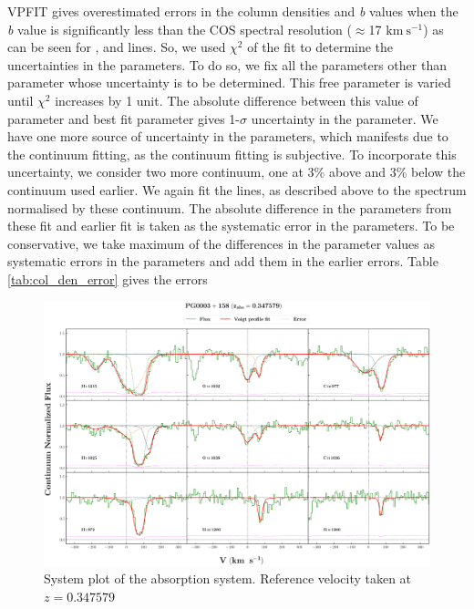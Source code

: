 VPFIT gives overestimated errors in the column densities and \emph{b} values when the \emph{b} value is significantly less than the COS spectral resolution ($\approx$17 $\text{km} \ \text{s}^{-1}$) as can be seen for ,  and  lines. So, we used $\chi^{2}$ of the fit to determine the uncertainties in the parameters. To do so, we fix all the parameters other than parameter whose uncertainty is to be determined. This free parameter is varied until $\chi^{2}$ increases by 1 unit. The absolute difference between this value of parameter and best fit parameter gives 1-$\sigma$ uncertainty in the parameter. We have one more source of uncertainty in the parameters, which manifests due to the continuum fitting, as the continuum fitting is subjective. To incorporate this uncertainty, we consider two more continuum, one at 3\% above and 3\% below the continuum used earlier. We again fit the lines, as described above to the spectrum normalised by these continuum.  The absolute difference in the parameters from these fit and earlier fit is taken as the systematic error in the parameters. To be conservative, we take maximum of the differences in the parameter values as systematic errors in the parameters and add them in the earlier errors. Table \ref{tab:col_den_error} gives the errors

\begin{landscape}

\thispagestyle{empty}

\begin{figure}
\centering
\vspace{-20mm}
\hspace*{-35mm}
\includegraphics[width=1.25\linewidth]{Figures/PG0003+158_z=0.347579_sys_plot.png}
\caption{System plot of the absorption system. Reference velocity taken at $z=0.347579$}
\label{fig:sys_plot}
\end{figure}

\end{landscape}

